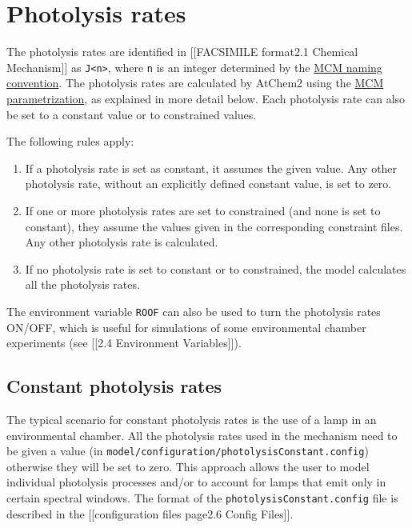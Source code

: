 \section{Photolysis rates} \label{sec:photolysis}

The photolysis rates are identified in {[}{[}FACSIMILE
format\textbar{}2.1 Chemical Mechanism{]}{]} as
\texttt{J\textless{}n\textgreater{}}, where \texttt{n} is an integer
determined by the
\href{http://mcm.leeds.ac.uk/MCMv3.3.1/parameters/photolysis.htt}{MCM
naming convention}. The photolysis rates are calculated by AtChem2 using
the
\href{http://mcm.leeds.ac.uk/MCM/parameters/photolysis_param.htt}{MCM
parametrization}, as explained in more detail below. Each photolysis
rate can also be set to a constant value or to constrained values.

The following rules apply:

\begin{enumerate}
\def\labelenumi{\arabic{enumi}.}
\item
  If a photolysis rate is set as constant, it assumes the given value.
  Any other photolysis rate, without an explicitly defined constant
  value, is set to zero.
\item
  If one or more photolysis rates are set to constrained (and none is
  set to constant), they assume the values given in the corresponding
  constraint files. Any other photolysis rate is calculated.
\item
  If no photolysis rate is set to constant or to constrained, the model
  calculates all the photolysis rates.
\end{enumerate}

The environment variable \texttt{ROOF} can also be used to turn the
photolysis rates ON/OFF, which is useful for simulations of some
environmental chamber experiments (see {[}{[}2.4 Environment
Variables{]}{]}).

\subsection{Constant photolysis rates}\label{constant-photolysis-rates}

The typical scenario for constant photolysis rates is the use of a lamp
in an environmental chamber. All the photolysis rates used in the
mechanism need to be given a value (in
\texttt{model/configuration/photolysisConstant.config}) otherwise they
will be set to zero. This approach allows the user to model individual
photolysis processes and/or to account for lamps that emit only in
certain spectral windows. The format of the
\texttt{photolysisConstant.config} file is described in the
{[}{[}configuration files page\textbar{}2.6 Config Files{]}{]}.

